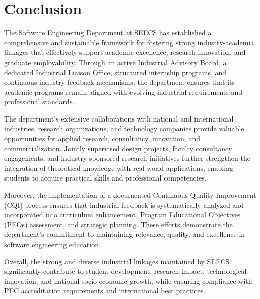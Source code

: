 \section{Conclusion}

The Software Engineering Department at SEECS has established a comprehensive and sustainable framework for fostering strong industry-academia linkages that effectively support academic excellence, research innovation, and graduate employability. Through an active Industrial Advisory Board, a dedicated Industrial Liaison Office, structured internship programs, and continuous industry feedback mechanisms, the department ensures that its academic programs remain aligned with evolving industrial requirements and professional standards.

The department’s extensive collaborations with national and international industries, research organizations, and technology companies provide valuable opportunities for applied research, consultancy, innovation, and commercialization. Jointly supervised design projects, faculty consultancy engagements, and industry-sponsored research initiatives further strengthen the integration of theoretical knowledge with real-world applications, enabling students to acquire practical skills and professional competencies.

Moreover, the implementation of a documented Continuous Quality Improvement (CQI) process ensures that industrial feedback is systematically analyzed and incorporated into curriculum enhancement, Program Educational Objectives (PEOs) assessment, and strategic planning. These efforts demonstrate the department’s commitment to maintaining relevance, quality, and excellence in software engineering education.

Overall, the strong and diverse industrial linkages maintained by SEECS significantly contribute to student development, research impact, technological innovation, and national socio-economic growth, while ensuring compliance with PEC accreditation requirements and international best practices.
